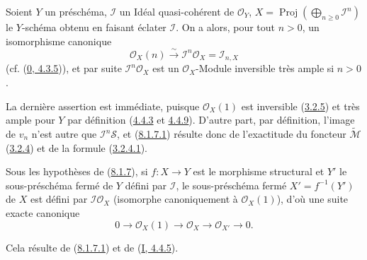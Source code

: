 
\begin{proposition}[8.1.7]
\label{II.8.1.7-fr}
Soient $Y$ un préschéma, $\mathcal{I}$ un Idéal quasi-cohérent de
$\mathcal{O}_Y$, $X=\operatorname{Proj}(\bigoplus_{n\geq0}\mathcal{I}^n)$ le
$Y$-schéma obtenu en faisant éclater $\mathcal{I}$. On a alors, pour tout
$n>0$, un isomorphisme canonique
\begin{equation}
\label{II.8.1.7.1-fr}
  \mathcal{O}_X(n)\xrightarrow{\sim}\mathcal{I}^n\mathcal{O}_X
  =\mathcal{I}_{n,X}
\tag{8.1.7.1}
\end{equation}
(cf. (\hyperref[0.4.3.5-fr]{0, 4.3.5})), et par suite
$\mathcal{I}^n\mathcal{O}_X$ est un $\mathcal{O}_X$-Module inversible très
ample si $n>0$.
\end{proposition}

La dernière assertion est immédiate, puisque $\mathcal{O}_X(1)$ est inversible
(\hyperref[II.3.2.5-fr]{3.2.5}) et très ample pour $Y$ par définition
(\hyperref[II.4.4.3-fr]{4.4.3} et \hyperref[II.4.4.9-fr]{4.4.9}). D'autre
part, par définition, l'image de $v_n$ n'est autre que
$\mathcal{I}^n\mathcal{S}$, et (\hyperref[II.8.1.7.1-fr]{8.1.7.1}) résulte donc
de l'exactitude du foncteur $\widetilde{\mathcal{M}}$
(\hyperref[II.3.2.4-fr]{3.2.4}) et de la formule
(\hyperref[II.3.2.4.1-fr]{3.2.4.1}).

\begin{corollary}[8.1.8]
\label{II.8.1.8-fr}
Sous les hypothèses de (\hyperref[II.8.1.7-fr]{8.1.7}), si $f:X\to Y$ est le
morphisme structural et $Y'$ le sous-préschéma fermé de $Y$ défini par
$\mathcal{I}$, le sous-préschéma fermé $X'=f^{-1}(Y')$ de $X$ est défini par
$\mathcal{I}\mathcal{O}_X$ (isomorphe canoniquement à $\mathcal{O}_X(1)$),
d'où une suite exacte canonique
\begin{equation}
\label{II.8.1.8.1-fr}
  0\to\mathcal{O}_X(1)\to\mathcal{O}_X\to\mathcal{O}_{X'}\to0.
\tag{8.1.8.1}
\end{equation}
\end{corollary}

Cela résulte de (\hyperref[II.8.1.7.1-fr]{8.1.7.1}) et de
(\hyperref[I.4.4.5-fr]{I, 4.4.5}).

